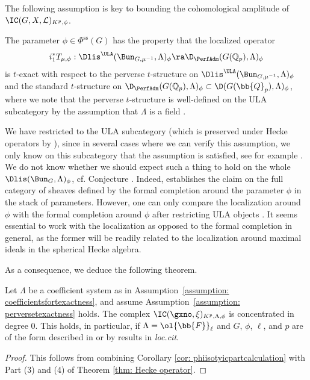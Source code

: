 \documentclass[letterpaper,11pt]{amsart}
\begin{document}
The following assumption is key to bounding the cohomological amplitude of $\IC(G,X,\mathcal{L})_{K^p,\phi}$. 
\begin{assumption}{\label{assumption: perversetexactness}}
The parameter $\phi \in \Phi^{\mathrm{ss}}(G)$ has the property that the localized operator
\[ i_{1}^{*}T_{\mu,\phi}: \Dlis^{\ULA}(\Bun_{G,\mu^{-1}},\Lambda)_{\phi} \ra \D_{\PerfAdm}(G(\mathbb{Q}_{p}),\Lambda)_{\phi} \]
is $t$-exact with respect to the perverse $t$-structure on $\Dlis^{\ULA}(\Bun_{G,\mu^{-1}},\Lambda)_{\phi}$ and the standard $t$-structure on $ \D_{\PerfAdm}(G(\mathbb{Q}_{p}),\Lambda)_{\phi} \subset \D(G(\bb{Q}_{p}),\Lambda)_{\phi}$, where we note that the perverse $t$-structure is well-defined on the ULA subcategory by the assumption that $\Lambda$ is a field \cite[Proposition 1.2.1]{HansenBeijingNotes}.
\end{assumption}
\begin{remark}
We have restricted to the ULA subcategory (which is preserved under Hecke operators by \cite[Theorem~I.7.2]{FSGeomLLC}), since in several cases where we can verify this assumption, we only know on this subcategory that the assumption is satisfied, see for example \cite[Corollary 4.27]{HamannLeeTorsion}. We do not know whether we should expect such a thing to hold on the whole $\Dlis(\Bun_{G},\Lambda)_\phi$, cf. Conjecture \cite[Conjecture~6.4]{HamannLeeTorsion}. Indeed, \cite[Theorem~3.38]{YangZhuTorsion} establishes the claim on the full category of sheaves defined by the formal completion around the parameter $\phi$ in the stack of parameters. However, one can only compare the localization around $\phi$ with the formal completion around $\phi$ after restricting ULA objects \cite[Remark~3.28]{YangZhuTorsion}. It seems essential to work with the localization as opposed to the formal completion in general, as the former will be readily related to the localization around maximal ideals in the spherical Hecke algebra.
\end{remark}

As a consequence, we deduce the following theorem.
\begin{theorem}{\label{thm: axiomatizedvanishingstatement}} Let $\Lambda$ be a coefficient system as in Assumption~\ref{assumption: coefficientsfortexactness}, and assume Assumption~\ref{assumption: perversetexactness} holds. The complex $\IC(\gxno,\xi)_{K^{p},\Lambda,\phi}$ is concentrated in degree $0$. This holds, in particular, if $\Lambda = \ol{\bb{F}}_{\ell}$ and $G$, $\phi$, $\ell$, and $p$ are of the form described in \cite[Corollary~4.29]{HamannLeeTorsion} or \cite[Theorem~8.2.1]{peng2025farguesscholzeparameterstorsionvanishing} by results in \textit{loc.cit}.
\end{theorem} 
\begin{proof}
This follows from combining Corollary \ref{cor: phiisotyicpartcalculation} with Part (3) and (4) of Theorem \ref{thm: Hecke operator}.
\end{proof}
\end{document}
